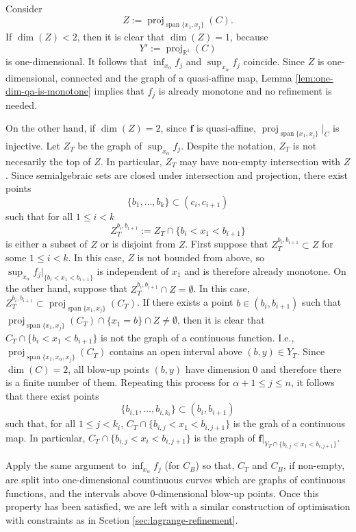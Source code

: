 \documentclass[
]{book}
\theoremstyle{definition}
\theoremstyle{definition}
\theoremstyle{definition}
\theoremstyle{definition}
\theoremstyle{remark}
\begin{document}
Consider \[
Z := {\operatorname{proj}_{{\operatorname{span} \{x_1,x_j\}}}}(C).
\]
If \(\dim(Z) < 2\), then it is clear that \(\dim(Z) = 1\), because
\[
Y' := {\operatorname{proj}_{\mathbb{R}^{1}}}(C)
\] is one-dimensional.
It follows that \(\inf_{x_\alpha} f_j\) and \(\sup_{x_\alpha} f_j\) coincide. Since \(Z\) is one-dimensional, connected and the graph of a quasi-affine map, Lemma \ref{lem:one-dim-qa-is-monotone} implies that \(f_j\) is already monotone and no refinement is needed.

On the other hand, if \(\dim(Z) = 2\), since \(\mathbf{f}\) is quasi-affine, \({\operatorname{proj}_{{\operatorname{span} \{x_1,x_j\}}}}\vert_C\) is injective.
Let \(Z_T\) be the graph of \(\sup_{x_\alpha} f_j\). Despite the notation, \(Z_T\) is not necesarily the top of \(Z\). In particular, \(Z_T\) may have non-empty intersection with \(Z\).
Since semialgebraic sets are closed under intersection and projection, there exist points
\[\{b_1,\ldots,b_k\} \subset (c_i,c_{i+1})
\] such that for all \(1 \le i < k\) \[
Z^{b_i,b_{i+1}}_T := Z_T \cap \{ b_i < x_1 < b_{i+1} \}
\]
is either a subset of \(Z\) or is disjoint from \(Z\).
First suppose that \(Z^{b_i,b_{i+1}}_T \subset Z\) for some \(1 \le i < k\).
In this case, \(Z\) is not bounded from above, so \(\sup_{x_\alpha} f_j \vert_{\{ b_i < x_1 < b_{i+1} \}}\) is independent of \(x_1\) and is therefore already monotone.
On the other hand, suppose that \(Z^{b_i,b_{i+1}}_T \cap Z = \emptyset\).
In this case, \(Z^{b_i,b_{i+1}}_T \subset {\operatorname{proj}_{{\operatorname{span} \{x_1,x_j\}}}}(C_T)\).
If there exists a point \(b \in (b_i,b_{i+1})\) such that \({\operatorname{proj}_{{\operatorname{span} \{x_1,x_j\}}}}(C_T) \cap \{x_1 = b\} \cap Z \neq \emptyset\),
then it is clear that \(C_T \cap \{ b_i < x_1 < b_{i+1} \}\) is not the graph of a continuous function.
I.e., \({\operatorname{proj}_{{\operatorname{span} \{x_1,x_\alpha,x_j\}}}}(C_T)\) contains an open interval above \((b,y) \in Y_T\).
Since \(\dim(C) = 2\), all blow-up points \((b,y)\) have dimension \(0\) and therefore there is a finite number of them. Repeating this process for \(\alpha + 1 \le j \le n\), it follows that there exist points
\[\{ b_{i,1}, \ldots, b_{i,k_i} \} \subset (b_i, b_{i+1})
\] such that, for all \(1 \le j < k_i\), \(C_T \cap \{ b_{i,j} < x_1 < b_{i,j+1} \}\) is the grah of a continuous map.
In particular, \(C_T \cap \{ b_{i,j} < x_i < b_{i,j+1} \}\) is the graph of \(\mathbf{f}\vert_{Y_T \cap \{ b_{i,j} < x_1 < b_{i,j+1} \}}\).

Apply the same argument to \(\inf_{x_\alpha} f_j\) (for \(C_B\)) so that, \(C_T\) and \(C_B\), if non-empty, are split into one-dimensional countinuous curves which are graphs of continuous functions, and the intervals above \(0\)-dimensional blow-up points. Once this property has been satisfied, we are left with a similar construction of optimisation with constraints as in Scetion \ref{sec:lagrange-refinement}.
\end{document}
